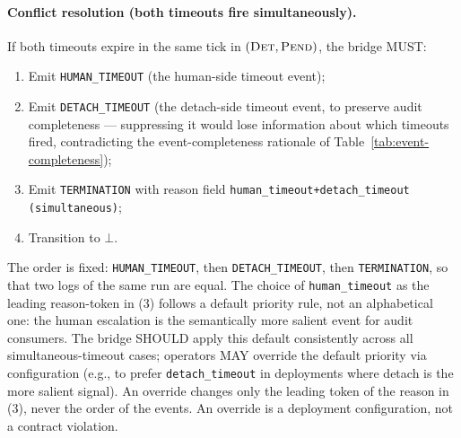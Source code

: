 \paragraph{Conflict resolution (both timeouts fire simultaneously).}
If both timeouts expire in the same tick in
$(\textsc{Det},\textsc{Pend})$, the bridge MUST:
\begin{enumerate}[leftmargin=2em]
\item Emit \texttt{HUMAN\_TIMEOUT} (the human-side timeout event);
\item Emit \texttt{DETACH\_TIMEOUT} (the detach-side timeout event,
to preserve audit completeness --- suppressing it would lose
information about which timeouts fired, contradicting the
event-completeness rationale of Table~\ref{tab:event-completeness});
\item Emit \texttt{TERMINATION} with reason field
\texttt{human\_timeout+detach\_timeout (simultaneous)};
\item Transition to $\bot$.
\end{enumerate}
The order is fixed: \texttt{HUMAN\_TIMEOUT}, then
\texttt{DETACH\_TIMEOUT}, then \texttt{TERMINATION}, so that two logs of the
same run are equal. The choice of \texttt{human\_timeout} as the leading
reason-token in (3) follows a default priority rule, not an
alphabetical one: the human escalation is the semantically more salient event for
audit consumers. The bridge
SHOULD apply this default consistently across all simultaneous-timeout
cases; operators MAY override the default priority via configuration
(e.g., to prefer \texttt{detach\_timeout} in deployments where
detach is the more salient signal). An override changes only the leading
token of the reason in (3), never the order of the events. An override is a
deployment configuration, not a contract violation.

